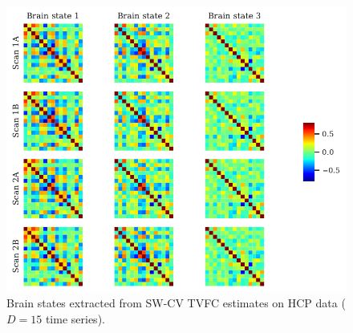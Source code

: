 \begin{figure}[ht]
  \centering
  \includegraphics[width=\textwidth, trim={0.0cm 0cm 0.0cm 0cm}, clip]{fig/hcp/d15/brain_states/k03/brain_states_SW_cross_validated}
  \caption{
    Brain states extracted from SW-CV TVFC estimates on HCP data ($D = 15$ time series).
  }\label{fig:hcp-results-brain-states-sw-cv}
\end{figure}
